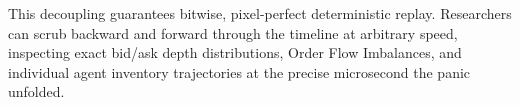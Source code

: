 This decoupling guarantees bitwise, pixel-perfect deterministic replay. Researchers can scrub backward and forward through the timeline at arbitrary speed, inspecting exact bid/ask depth distributions, Order Flow Imbalances, and individual agent inventory trajectories at the precise microsecond the panic unfolded.
